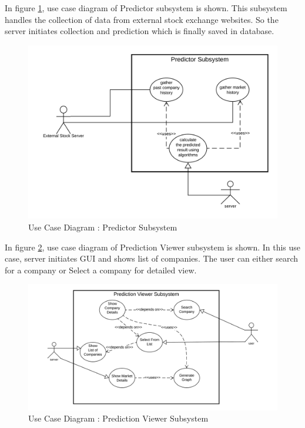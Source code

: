 \documentclass{article}[12pt]
\begin{document}
    In figure \ref{fig:USD_Predictor}, use case diagram of Predictor subsystem is shown. This subsystem handles the collection of data from external stock exchange websites. So the server initiates collection and prediction which is finally saved in database.

    \begin{figure}[!h]
        \centering
        \includegraphics[width=.9\textwidth]{Images/USD_Predictor.png}
        \caption{Use Case Diagram : Predictor Subsystem}
        \label{fig:USD_Predictor}
    \end{figure}
    
    In figure \ref{fig:USD_Viewer}, use case diagram of Prediction Viewer subsystem is shown. In this use case, server initiates GUI and shows list of companies. The user can either search for a company or Select a company for detailed view.

    \begin{figure}[!h]
        \centering
        \includegraphics[width=.9\textwidth]{Images/USD_Viewer.png}
        \caption{Use Case Diagram : Prediction Viewer Subsystem}
        \label{fig:USD_Viewer}
    \end{figure}
\end{document}
